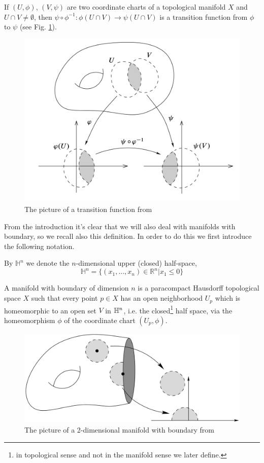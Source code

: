 \noindent If $(U, \phi)$, $(V, \psi)$ are two coordinate charts of a topological manifold $X$ and $U\cap V\neq\emptyset$, then $\psi \circ \phi^{-1} : \phi(U\cap V) \to \psi(U\cap V)$ is a transition function from $\phi$ to $\psi$ (see Fig. \ref{fig:Lee_TransitionMap}).
\begin{figure}
    \centering
    \captionsetup{format = hang}
    \includegraphics[width=12cm]{images/Lecture 2/Lee_TransitionMap .png} 
    \caption{\small{The picture of a transition function from \cite{Lee2012}}}
    \label{fig:Lee_TransitionMap}
\end{figure}

From the introduction it's clear that we will also deal with manifolds with boundary, so we recall also this definition. In order to do this we first introduce the following notation.
\begin{notat}
    By $\mathbb{H}^n$ we denote the $n$-dimensional upper (closed) half-space,
    $$\mathbb{H}^n=\{(x_1,...,x_n)\in\mathbb{R}^n|x_1 \leq 0\}$$ 
\end{notat}
\begin{defn}
    A manifold with boundary of dimension $n$ is a paracompact Hausdorff topological space $X$ such that every point $p \in X$ has an open neighborhood $U_p$ which is homeomorphic to an open set $V$ in $\mathbb{H}^n$, i.e. the closed\footnote{in topological sense and not in the manifold sense we later define.} half space, via the homeomorphism $\phi$ of the coordinate chart $(U_p,\phi)$.
\end{defn}
\begin{figure}
    \centering
    \captionsetup{format = hang}
    \includegraphics[width=12cm]{images/Lecture 2/Manifold with boundary.png} 
    \caption{\small{The picture of a 2-dimensional manifold with boundary from \cite{Lee2012}}}
    \label{fig:Manifold_w_boundary}
\end{figure}

